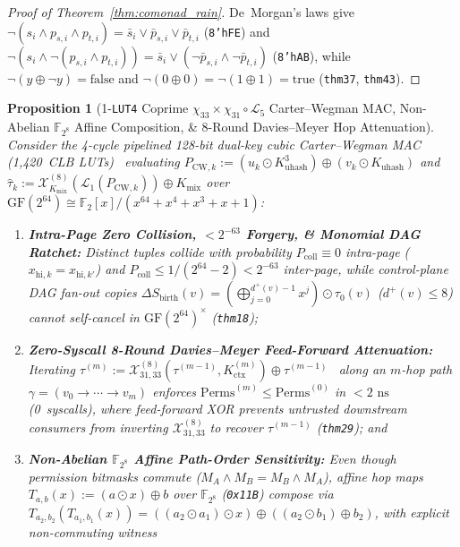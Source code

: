 \documentclass[11pt,letterpaper]{article}
\providecommand{\SharedCubicMacLUTs}{1,420}
\theoremstyle{spectralthm}
\newtheorem{proposition}[theorem]{Proposition}
\begin{document}
\begin{proof}[Proof of Theorem~\ref{thm:comonad_rain}]
De~Morgan's laws give $\neg(s_i \wedge p_{s,i} \wedge p_{t,i}) = \bar{s}_i \vee \bar{p}_{s,i} \vee \bar{p}_{t,i}$ (\texttt{8'hFE}) and $\neg(s_i \wedge \neg(p_{s,i} \wedge p_{t,i})) = \bar{s}_i \vee (\neg\bar{p}_{s,i} \wedge \neg\bar{p}_{t,i})$ (\texttt{8'hAB}), while $\neg(y \oplus \neg y) = \mathrm{false}$ and $\neg(0 \oplus 0) = \neg(1 \oplus 1) = \mathrm{true}$ (\texttt{thm37}, \texttt{thm43}).
\end{proof}

\begin{proposition}[1-\texttt{LUT4} Coprime $\chi_{33}\times\chi_{31}\circ\mathcal{L}_5$ Carter--Wegman MAC, Non-Abelian $\mathbb{F}_{2^8}$ Affine Composition, \& 8-Round Davies--Meyer Hop Attenuation]
\label{prop:nonabelian_ifc}
\label{thm:mac}
\label{thm:dag}
Consider the 4-cycle pipelined 128-bit dual-key cubic Carter--Wegman MAC (\SharedCubicMacLUTs~CLB LUTs)~\cite{carter1979universal} evaluating $P_{\mathrm{CW},k} := (u_k \odot K_{\mathrm{uhash}}^3) \oplus (v_k \odot K_{\mathrm{uhash}})$ and $\hat{\tau}_k := \mathcal{X}_{K_{\mathrm{mix}}}^{(8)}(\mathcal{L}_1(P_{\mathrm{CW},k})) \oplus K_{\mathrm{mix}}$ over $\mathrm{GF}(2^{64}) \cong \mathbb{F}_2[x]/(x^{64}+x^4+x^3+x+1)$:
\begin{enumerate}
  \item[(i)] \textbf{Intra-Page Zero Collision, $<2^{-63}$ Forgery, \& Monomial DAG Ratchet:} Distinct tuples collide with probability $P_{\mathrm{coll}} \equiv 0$ intra-page ($x_{\mathrm{hi},k} = x_{\mathrm{hi},k'}$) and $P_{\mathrm{coll}} \le 1/(2^{64}-2) < 2^{-63}$ inter-page, while control-plane DAG fan-out copies $\Delta S_{\mathrm{birth}}(v) = (\bigoplus_{j=0}^{d^+(v)-1} x^j) \odot \tau_0(v)$ ($d^+(v) \le 8$) cannot self-cancel in $\mathrm{GF}(2^{64})^\times$ (\texttt{thm18});
  \item[(ii)] \textbf{Zero-Syscall 8-Round Davies--Meyer Feed-Forward Attenuation:} Iterating $\tau^{(m)} := \mathcal{X}_{31,33}^{(8)}(\tau^{(m-1)}, K_{\mathrm{ctx}}^{(m)}) \oplus \tau^{(m-1)}$~\cite{birgisson2014macaroons} along an $m$-hop path $\gamma = (v_0 \to \cdots \to v_m)$ enforces $\mathrm{Perms}^{(m)} \le \mathrm{Perms}^{(0)}$ in $<2\text{~ns}$ (0~syscalls), where feed-forward XOR prevents untrusted downstream consumers from inverting $\mathcal{X}_{31,33}^{(8)}$ to recover $\tau^{(m-1)}$ (\texttt{thm29}); and
  \item[(iii)] \textbf{Non-Abelian $\mathbb{F}_{2^8}$ Affine Path-Order Sensitivity:} Even though permission bitmasks commute ($M_A \wedge M_B = M_B \wedge M_A$), affine hop maps $T_{a,b}(x) := (a \odot x) \oplus b$ over $\mathbb{F}_{2^8}$ (\texttt{0x11B}) compose via $T_{a_2,b_2}(T_{a_1,b_1}(x)) = ((a_2 \odot a_1)\odot x) \oplus ((a_2 \odot b_1) \oplus b_2)$, with explicit non-commuting witness

\end{enumerate}
\end{proposition}
\end{document}
